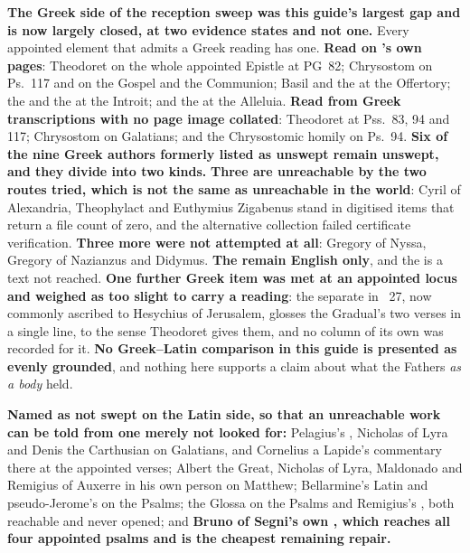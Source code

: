 \textbf{The Greek side of the reception sweep was this guide's largest gap and
is now largely closed, at two evidence states and not one.} Every appointed
element that admits a Greek reading has one. \textbf{Read on 's own pages}: Theodoret on the whole appointed Epistle at PG~82;
Chrysostom on Ps.~117 and on the Gospel and the Communion; Basil and the
 at the Offertory; the  and the
 at the Introit; and the  at
the Alleluia. \textbf{Read from Greek transcriptions with no page image
collated}: Theodoret at Pss.~83, 94 and 117; Chrysostom on Galatians; and the
Chrysostomic homily on Ps.~94. \textbf{Six of the nine Greek authors formerly listed as unswept remain unswept,
and they divide into two kinds.} \textbf{Three are unreachable by the two routes
tried, which is not the same as unreachable in the world}: Cyril of Alexandria,
Theophylact and Euthymius Zigabenus stand in digitised 
items that return a file count of zero, and the alternative collection failed
certificate verification. \textbf{Three more were not attempted at all}: Gregory
of Nyssa, Gregory of Nazianzus and Didymus. \textbf{The  remain English
only}, and the  is a  text not reached. \textbf{One further Greek item was met at an appointed
locus and weighed as too slight to carry a reading}: the separate  in ~27, now commonly ascribed to
Hesychius of Jerusalem, glosses the Gradual's two verses in a single line, to
the sense Theodoret gives them, and no column of its own was recorded for it.
\textbf{No Greek--Latin comparison in this guide is
presented as evenly grounded}, and nothing here supports a claim about what the
Fathers \emph{as a body} held.

\textbf{Named as not swept on the Latin side, so that an unreachable work can be
told from one merely not looked for:} Pelagius's , Nicholas of
Lyra and Denis the Carthusian on Galatians, and Cornelius a Lapide's commentary
there at the appointed verses;
Albert the Great, Nicholas of Lyra, Maldonado and Remigius of Auxerre in his own
person on Matthew; Bellarmine's Latin  and pseudo-Jerome's
 on the Psalms; the Glossa on the Psalms and Remigius's
, both reachable and never opened; and
\textbf{Bruno of Segni's own , which reaches all four
appointed psalms and is the cheapest remaining repair.}

